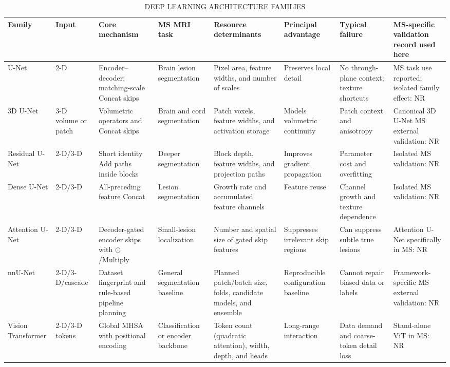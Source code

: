 \documentclass[journal,twoside,web]{ieeecolor}
\begin{document}
\begin{table}[!t]
\centering
\caption{DEEP LEARNING ARCHITECTURE FAMILIES}
\label{tab:3}
\scriptsize
\setlength{\tabcolsep}{2.2pt}
\renewcommand{\arraystretch}{1.10}
\begin{tabularx}{\textwidth}{@{}ZZZZZZZZ@{}}
\toprule
\textbf{Family} & \textbf{Input} & \textbf{Core mechanism} & \textbf{MS MRI task} & \textbf{Resource determinants} & \textbf{Principal advantage} & \textbf{Typical failure} & \textbf{MS-specific validation record used here} \\
\midrule
U-Net & 2-D & Encoder--decoder; matching-scale Concat skips & Brain lesion segmentation & Pixel area, feature widths, and number of scales & Preserves local detail & No through-plane context; texture shortcuts & MS task use reported; isolated family effect: NR \\
3D U-Net & 3-D volume or patch & Volumetric operators and Concat skips & Brain and cord segmentation & Patch voxels, feature widths, and activation storage & Models volumetric continuity & Patch context and anisotropy & Canonical 3D U-Net MS external validation: NR \\
Residual U-Net & 2-D/3-D & Short identity Add paths inside blocks & Deeper segmentation & Block depth, feature widths, and projection paths & Improves gradient propagation & Parameter cost and overfitting & Isolated MS validation: NR \\
Dense U-Net & 2-D/3-D & All-preceding feature Concat & Lesion segmentation & Growth rate and accumulated feature channels & Feature reuse & Channel growth and texture dependence & Isolated MS validation: NR \\
Attention U-Net & 2-D/3-D & Decoder-gated encoder skips with $\odot$/Multiply & Small-lesion localization & Number and spatial size of gated skip features & Suppresses irrelevant skip regions & Can suppress subtle true lesions & Attention U-Net specifically in MS: NR \\
nnU-Net & 2-D/3-D/cascade & Dataset fingerprint and rule-based pipeline planning & General segmentation baseline & Planned patch/batch size, folds, candidate models, and ensemble & Reproducible configuration baseline & Cannot repair biased data or labels & Framework-specific MS external validation: NR \\
Vision Transformer & 2-D/3-D tokens & Global MHSA with positional encoding & Classification or encoder backbone & Token count (quadratic attention), width, depth, and heads & Long-range interaction & Data demand and coarse-token detail loss & Stand-alone ViT in MS: NR \\

\end{tabularx}
\end{table}
\end{document}
